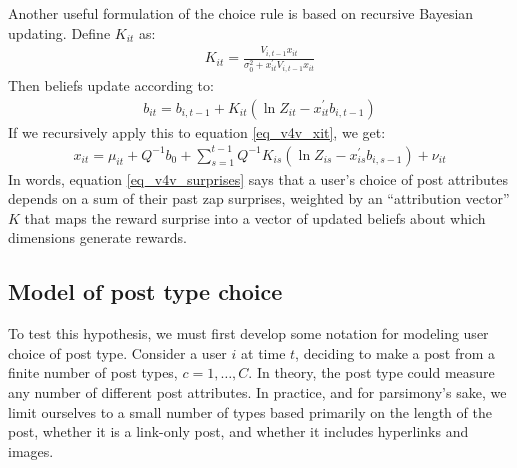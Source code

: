 Another useful formulation of the choice rule is based on recursive Bayesian updating. Define $K_{it}$ as:
\begin{align}
K_{it} = \frac{V_{i,t-1} x_{it}}{\sigma_0^2+x_{it}^\prime V_{i,t-1} x_{it}}
\end{align}
Then beliefs update according to:
\begin{align}
b_{it} = b_{i,t-1} + K_{it} \left( \ln Z_{it} - x_{it}^\prime b_{i,t-1} \right)
\end{align}
If we recursively apply this to equation \eqref{eq_v4v_xit}, we get:
\begin{align}
x_{it} = \mu_{it} + Q^{-1} b_0 + \sum_{s=1}^{t-1} Q^{-1} K_{is} \left( \ln Z_{is} - x_{is}^\prime b_{i,s-1} \right) + \nu_{it} \label{eq_v4v_surprises}
\end{align}
In words, equation \eqref{eq_v4v_surprises} says that a user's choice of post attributes depends on a sum of their past zap surprises, weighted by an ``attribution vector'' $K$ that maps the reward surprise into a vector of updated beliefs about which dimensions generate rewards.

\subsection{Model of post type choice} \label{sec_v4v_model}

To test this hypothesis, we must first develop some notation for modeling user choice of post type. Consider a user $i$ at time $t$, deciding to make a post from a finite number of post types, $c = 1,\ldots,C$. In theory, the post type could measure any number of different post attributes. In practice, and for parsimony's sake, we limit ourselves to a small number of types based primarily on the length of the post, whether it is a link-only post, and whether it includes hyperlinks and images.

